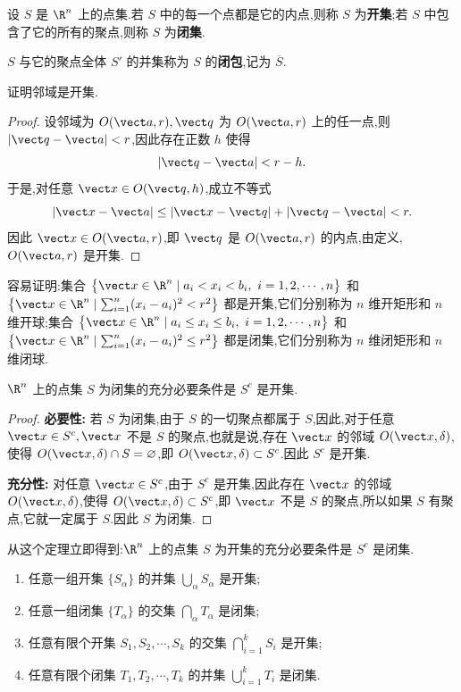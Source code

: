 \begin{definition}
设 $S$ 是 $\R^n$ 上的点集.若 $S$ 中的每一个点都是它的内点,则称 $S$ 为\textbf{开集};若 $S$ 中包含了它的所有的聚点,则称 $S$ 为\textbf{闭集}.

$S$ 与它的聚点全体 $S'$ 的并集称为 $S$ 的\textbf{闭包},记为 $\overline S$.
\end{definition}

\begin{example}
证明邻域是开集.
\end{example}

\begin{proof}
设邻域为 $O(\vect a,r),\vect q$ 为 $O(\vect a,r)$ 上的任一点,则 $|\vect q-\vect a|<r$,因此存在正数 $h$ 使得
\[
|\vect q-\vect a|<r-h.
\]
于是,对任意 $\vect x\in O(\vect q,h)$,成立不等式
\[
|\vect x-\vect a|\leq|\vect x-\vect q|+|\vect q-\vect a|<r.
\]
因此 $\vect x\in O(\vect a,r)$,即 $\vect q$ 是 $O(\vect a,r)$ 的内点,由定义,$O(\vect a,r)$ 是开集.
\end{proof}

容易证明:集合 $\bigl\{\vect x\in\R^n\mid a_i<x_i<b_i,\ i=1,2,\cdots,n\bigr\}$ 和 $\bigl\{\vect x\in\R^n\mid\sum_{i=1}^n(x_i-a_i)^2<r^2\bigr\}$ 都是开集,它们分别称为 $n$ 维开矩形和 $n$ 维开球;集合 $\bigl\{\vect x\in\R^n\mid a_i\leq x_i\leq b_i,\ i=1,2,\cdots,n\bigr\}$ 和 $\bigl\{\vect x\in\R^n\mid\sum_{i=1}^n(x_i-a_i)^2\leq r^2\bigr\}$ 都是闭集,它们分别称为 $n$ 维闭矩形和 $n$ 维闭球.

\begin{proposition}
$\R^n$ 上的点集 $S$ 为闭集的充分必要条件是 $S^c$ 是开集.
\end{proposition}

\begin{proof}
\textbf{必要性:} 若 $S$ 为闭集,由于 $S$ 的一切聚点都属于 $S$,因此,对于任意 $\vect x\in S^c,\vect x$ 不是 $S$ 的聚点,也就是说,存在 $\vect x$ 的邻域 $O(\vect x,\delta)$,使得 $O(\vect x,\delta)\cap S=\varnothing$,即 $O(\vect x,\delta)\subset S^c$.因此 $S^c$ 是开集.

\textbf{充分性:} 对任意 $\vect x\in S^c$,由于 $S^c$ 是开集,因此存在 $\vect x$ 的邻域 $O(\vect x,\delta)$,使得 $O(\vect x,\delta)\subset S^c$,即 $\vect x$ 不是 $S$ 的聚点,所以如果 $S$ 有聚点,它就一定属于 $S$.因此 $S$ 为闭集.
\end{proof}

从这个定理立即得到:$\R^n$ 上的点集 $S$ 为开集的充分必要条件是 $S^c$ 是闭集.

\begin{proposition}
\begin{enumerate}
\item[(1)] 任意一组开集 $\{S_\alpha\}$ 的并集 $\bigcup_\alpha S_\alpha$ 是开集;
\item[(2)] 任意一组闭集 $\{T_\alpha\}$ 的交集 $\bigcap_\alpha T_\alpha$ 是闭集;
\item[(3)] 任意有限个开集 $S_1,S_2,\cdots,S_k$ 的交集 $\bigcap_{i=1}^k S_i$ 是开集;
\item[(4)] 任意有限个闭集 $T_1,T_2,\cdots,T_k$ 的并集 $\bigcup_{i=1}^k T_i$ 是闭集.
\end{enumerate}
\end{proposition}

